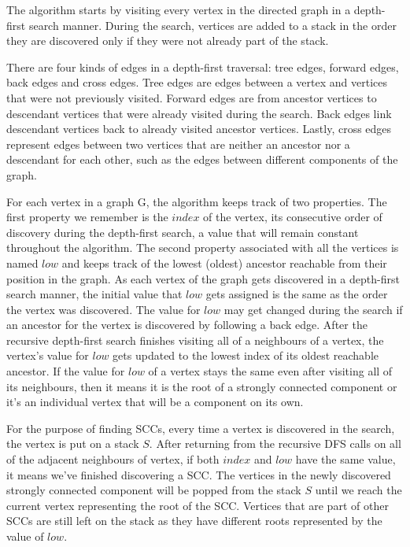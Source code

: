 \documentclass{l4proj}
\begin{document}
\noindent The algorithm starts by visiting every vertex in the directed graph in a depth-first search manner. During the search, vertices are added to a stack in the order they are discovered only if they were not already part of the stack.

\noindent There are four kinds of edges in a depth-first traversal: tree edges, forward edges, back edges and cross edges. Tree edges are edges between a vertex and vertices that were not previously visited. Forward edges are from ancestor vertices to descendant vertices that were already visited during the search. Back edges link descendant vertices back to already visited ancestor vertices. Lastly, cross edges represent edges between two vertices that are neither an ancestor nor a descendant for each other, such as the edges between different components of the graph. 

\noindent For each vertex in a graph G, the algorithm keeps track of two properties. The first property we remember is the $index$ of the vertex, its consecutive order of discovery during the depth-first search, a value that will remain constant throughout the algorithm. The second property associated with all the vertices is named $low$ and keeps track of the lowest (oldest) ancestor reachable from their position in the graph. As each vertex of the graph gets discovered in a depth-first search manner, the initial value that $low$ gets assigned is the same as the order the vertex was discovered. The value for $low$ may get changed during the search if an ancestor for the vertex is discovered by following a back edge. After the recursive depth-first search finishes visiting all of a neighbours of a vertex, the vertex's value for $low$ gets updated to the lowest index of its oldest reachable ancestor. If the value for $low$ of a vertex stays the same even after visiting all of its neighbours, then it means it is the root of a strongly connected component or it's an individual vertex that will be a component on its own.

\noindent For the purpose of finding SCCs, every time a vertex is discovered in the search, the vertex is put on a stack $S$. After returning from the recursive DFS calls on all of the adjacent neighbours of vertex, if both $index$ and $low$ have the same value, it means we've finished discovering a SCC. The vertices in the newly discovered strongly connected component will be popped from the stack $S$ until we reach the current vertex representing the root of the SCC. Vertices that are part of other SCCs are still left on the stack as they have different roots represented by the value of $low$.
\end{document}
